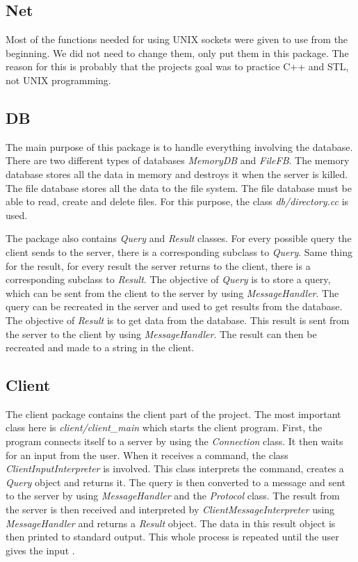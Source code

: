 \documentclass[10pt, a4paper]{article}
\begin{document}
\subsection{Net}
Most of the functions needed for using UNIX sockets were given to use from the beginning. We did not need to change them, only put them in this package. The reason for this is probably that the projects goal was to practice C++ and STL, not UNIX programming.

\subsection{DB}
The main purpose of this package is to handle everything involving the database. There are two different types of databases \emph{MemoryDB} and \emph{FileFB}. The memory database stores all the data in memory and destroys it when the server is killed. The file database stores all the data to the file system. The file database must be able to read, create and delete files. For this purpose, the class \emph{db/directory.cc} is used.

The package also contains \emph{Query} and \emph{Result} classes. For every possible query the client sends to the server, there is a corresponding subclass to \emph{Query}. Same thing for the result, for every result the server returns to the client, there is a corresponding subclass to \emph{Result}. The objective of \emph{Query} is to store a query, which can be sent from the client to the server by using \emph{MessageHandler}. The query can be recreated in the server and used to get results from the database. The objective of \emph{Result} is to get data from the database. This result is sent from the server to the client by using \emph{MessageHandler}. The result can then be recreated and made to a string in the client.

\subsection{Client}
The client package contains the client part of the project. The most important class here is \emph{client/client\_main} which starts the client program. First, the program connects itself to a server by using the \emph{Connection} class. It then waits for an input from the user. When it receives a command, the class \emph{ClientInputInterpreter} is involved. This class interprets the command, creates a \emph{Query} object and returns it. The query is then converted to a message and sent to the server by using \emph{MessageHandler} and the \emph{Protocol} class. The result from the server is then received and interpreted by \emph{ClientMessageInterpreter} using \emph{MessageHandler} and returns a \emph{Result} object. The data in this result object is then printed to standard output. This whole process is repeated until the user gives the input \cite{'exit'}.
\end{document}
